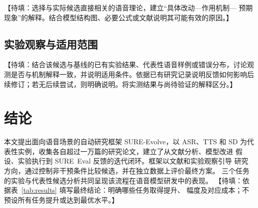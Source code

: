 \documentclass{article}
\newcommand{\pending}[1]{\textcolor{blue!65!black}{【待填：#1】}}
\begin{document}
\pending{选择与实际候选直接相关的语音理论，建立“具体改动—作用机制—
预期现象”的解释。结合模型结构图、必要公式或文献说明其可能有效的原因。}

\subsection{实验观察与适用范围}

\pending{结合该候选与基线的已有实验结果、代表性语音样例或错误分布，讨论观测是否与机制解释一致，并说明适用条件。依据已有研究记录说明反馈如何影响后续修订；若无后续尝试，则明确说明。将实测结果与尚待验证的解释区分。}

\section{结论}
\label{sec:conclusion}

本文提出面向语音场景的自动研究框架 SURE-Evolve，以 ASR、TTS 和 SD
为代表性实例，收集各自超过一万篇的研究论文，建立了从文献分析、模型改进
假设、实验执行到 SURE~Eval 反馈的迭代闭环。框架以文献和实验观察引导
研究方向，通过控制非干预条件比较候选，并在独立数据上评价最终方案。
三个任务的实验与代表性候选分析共同呈现该流程在语音模型研发中的表现。
\pending{依据表~\ref{tab:results} 填写最终结论：明确哪些任务取得提升、
幅度及对应成本；不预设所有任务提升或达到最优水平。}

\clearpage
\begingroup
{}


\endgroup
\end{document}
